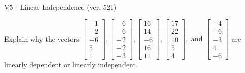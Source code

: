 \begin{exercise}
  \begin{exerciseTitle}V5 - Linear Independence (ver. 521)\end{exerciseTitle}
  \begin{exerciseStatement}
    Explain why the vectors \(\left[\begin{array}{r}
-1 \\
-2 \\
-6 \\
5 \\
1
\end{array}\right] , \left[\begin{array}{r}
-6 \\
-6 \\
-2 \\
-2 \\
-3
\end{array}\right] , \left[\begin{array}{r}
16 \\
14 \\
-6 \\
16 \\
11
\end{array}\right] , \left[\begin{array}{r}
17 \\
22 \\
10 \\
5 \\
4
\end{array}\right] , \text{ and } \left[\begin{array}{r}
-4 \\
-6 \\
-3 \\
4 \\
-6
\end{array}\right]\) are linearly dependent or linearly independent.	



\end{exerciseStatement}
\end{exercise}
